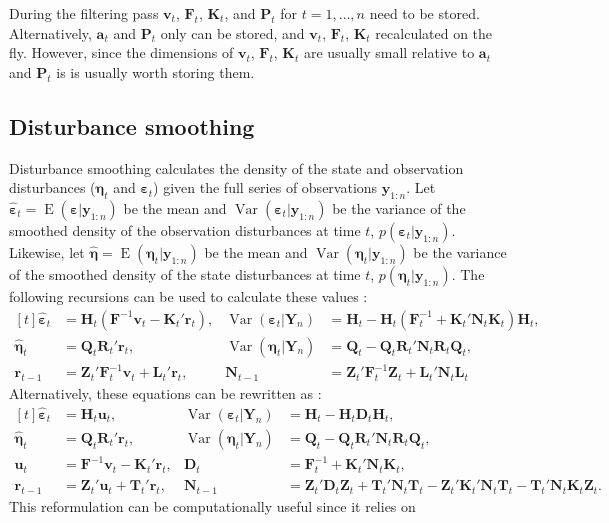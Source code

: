 \documentclass[]{book}
\DeclareMathOperator{\E}{E}
\DeclareMathOperator{\Var}{Var}
\newcommand{\mat}[1]{\boldsymbol{#1}}
\renewcommand{\vec}[1]{\boldsymbol{#1}}
\renewcommand{\T}{'}
\begin{document}
During the filtering pass \(\vec{v}_t\), \(\mat{F}_t\), \(\mat{K}_t\),
and \(\mat{P}_t\) for \(t = 1, \dots, n\) need to be stored.
Alternatively, \(\vec{a}_t\) and \(\mat{P}_t\) only can be stored, and
\(\vec{v}_t\), \(\mat{F}_t\), \(\mat{K}_t\) recalculated on the fly.
However, since the dimensions of \(\vec{v}_t\), \(\mat{F}_t\),
\(\mat{K}_t\) are usually small relative to \(\vec{a}_t\) and
\(\mat{P}_t\) is is usually worth storing them.

\subsection{Disturbance smoothing}\label{disturbance-smoothing}

Disturbance smoothing calculates the density of the state and
observation disturbances (\(\vec{\eta}_t\) and \(\vec{\varepsilon}_t\))
given the full series of observations \(\vec{y}_{1:n}\). Let
\(\hat{\vec{\varepsilon}}_t = \E(\vec{\varepsilon} | \vec{y}_{1:n})\) be
the mean and \(\Var(\vec{\varepsilon}_t | \vec{y}_{1:n})\) be the
variance of the smoothed density of the observation disturbances at time
\(t\), \(p(\vec{\varepsilon}_t | \vec{y}_{1:n})\). Likewise, let
\(\hat{\vec{\eta}} = \E(\vec{\eta}_t | \vec{y}_{1:n})\) be the mean and
\(\Var(\vec{\eta}_t | \vec{y}_{1:n})\) be the variance of the smoothed
density of the state disturbances at time \(t\),
\(p(\vec{\eta}_t | \vec{y}_{1:n})\). The following recursions can be
used to calculate these values \autocite[Eq 4.69]{DurbinKoopman2012}: \[
\begin{aligned}[t]
\hat{\vec{\varepsilon}}_t &= \mat{H}_t (\mat{F}^{-1} \vec{v}_t - \mat{K}_t\T \vec{r}_t) , &
\Var(\vec{\varepsilon}_t | \mat{Y}_n) &= \mat{H}_t - \mat{H}_t (\mat{F}_t^{-1} + \mat{K}_t\T \mat{N}_t \mat{K}_t) \mat{H}_t , \\
\hat{\vec{\eta}}_t &= \mat{Q}_t \mat{R}_t\T \vec{r}_t , &
\Var(\vec{\eta}_t | \mat{Y}_n) &= \mat{Q}_t - \mat{Q}_t \mat{R}_t\T \mat{N}_t \mat{R}_t \mat{Q}_t , \\
\vec{r}_{t - 1} &= \mat{Z}_t\T \mat{F}_t^{-1} \vec{v}_t + \mat{L}_t\T \vec{r}_t , &
\mat{N}_{t - 1} &= \mat{Z}_t\T \mat{F}_t^{-1} \mat{Z}_t + \mat{L}_t\T \mat{N}_t \mat{L}_t
\end{aligned}
\] Alternatively, these equations can be rewritten as \autocite[Sec
4.5.3]{DurbinKoopman2012}: \[
\begin{aligned}[t]
\hat{\vec{\varepsilon}}_t &= \mat{H}_t \vec{u}_t , &
\Var(\vec{\varepsilon}_t | \mat{Y}_n) &= \mat{H}_t - \mat{H}_t \mat{D}_t \mat{H}_t , \\
\hat{\vec{\eta}}_t &= \mat{Q}_t \mat{R}_t\T \vec{r}_t , &
\Var(\vec{\eta}_t | \mat{Y}_n) &= \mat{Q}_t - \mat{Q}_t \mat{R}_t\T \mat{N}_t \mat{R}_t \mat{Q}_t , \\
\vec{u}_t &= \mat{F}^{-1} \vec{v}_t - \mat{K}_t\T \vec{r}_t , &
\mat{D}_t &= \mat{F}_t^{-1} + \mat{K}_t\T \mat{N}_t \mat{K}_t , \\
\vec{r}_{t - 1} &= \mat{Z}_t\T \vec{u}_t + \mat{T}_t\T \vec{r}_t , &
\mat{N}_{t - 1} &= \mat{Z}_t\T \mat{D}_t \mat{Z}_t + \mat{T}_t\T \mat{N}_t \mat{T}_t - \mat{Z}_t\T \mat{K}_t\T \mat{N}_t \mat{T}_t - \mat{T}_t\T \mat{N}_t \mat{K}_t \mat{Z}_t .
\end{aligned}
\] This reformulation can be computationally useful since it relies on
\end{document}
